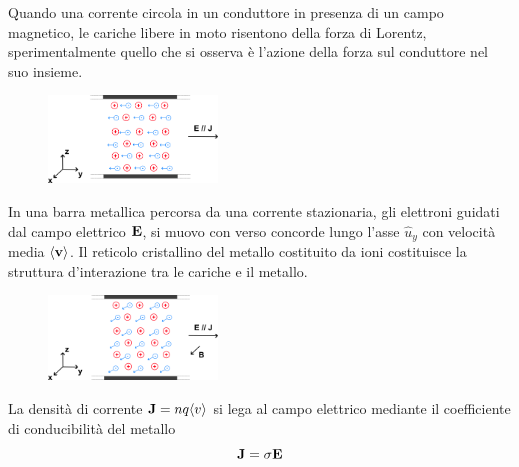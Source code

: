 Quando una corrente circola in un conduttore in presenza di un campo magnetico, le cariche libere in moto risentono della forza di Lorentz, sperimentalmente quello che si osserva \`e l'azione della forza sul conduttore nel suo insieme.

\begin{figure}  %
    \centering
    \includegraphics[width=0.4\textwidth]{images/hall1}  %
\end{figure}
 In una barra metallica percorsa da una corrente stazionaria, gli elettroni guidati dal campo elettrico $\bold{E}$, si muovo con verso concorde lungo l'asse $\hat{u}_{y}$ con velocit\`a media $\langle \bold{v} \rangle $. Il reticolo cristallino del metallo costituito da ioni costituisce la struttura d'interazione tra le cariche e il metallo.
  \begin{figure}  %
  \vspace{-1.6cm}
    \centering
    \includegraphics[width=0.4\textwidth]{images/hall2}  %
\end{figure}
La densit\`a di corrente $\bold{J} = nq \langle v \rangle $ si lega al campo elettrico mediante il coefficiente di conducibilit\`a del metallo 
 \begin{equation*}
 	\bold{J} = \sigma \bold{E}
 \end{equation*}

